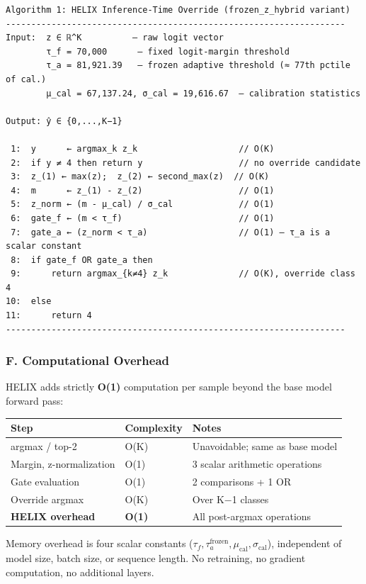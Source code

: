 \documentclass[
  conference]{IEEEtran}
\newcounter{none} %
\begin{document}
\begin{verbatim}
Algorithm 1: HELIX Inference-Time Override (frozen_z_hybrid variant)
-------------------------------------------------------------------
Input:  z ∈ ℝ^K          — raw logit vector
        τ_f = 70,000      — fixed logit-margin threshold
        τ_a = 81,921.39   — frozen adaptive threshold (≈ 77th pctile of cal.)
        μ_cal = 67,137.24, σ_cal = 19,616.67  — calibration statistics

Output: ŷ ∈ {0,...,K−1}

 1:  y      ← argmax_k z_k                    // O(K)
 2:  if y ≠ 4 then return y                   // no override candidate
 3:  z_(1) ← max(z);  z_(2) ← second_max(z)  // O(K)
 4:  m      ← z_(1) - z_(2)                   // O(1)
 5:  z_norm ← (m - μ_cal) / σ_cal             // O(1)
 6:  gate_f ← (m < τ_f)                       // O(1)
 7:  gate_a ← (z_norm < τ_a)                  // O(1) — τ_a is a scalar constant
 8:  if gate_f OR gate_a then
 9:      return argmax_{k≠4} z_k              // O(K), override class 4
10:  else
11:      return 4
-------------------------------------------------------------------
\end{verbatim}

\subsubsection{F. Computational
Overhead}\label{f.-computational-overhead}

HELIX adds strictly \textbf{O(1)} computation per sample beyond the base
model forward pass:

{\def\LTcaptype{none} %
\begin{longtable}[]{@{}lll@{}}
\toprule\noalign{}
Step & Complexity & Notes \\
\midrule\noalign{}
\endhead
\bottomrule\noalign{}
\endlastfoot
argmax / top-2 & O(K) & Unavoidable; same as base model \\
Margin, z-normalization & O(1) & 3 scalar arithmetic operations \\
Gate evaluation & O(1) & 2 comparisons + 1 OR \\
Override argmax & O(K) & Over K−1 classes \\
\textbf{HELIX overhead} & \textbf{O(1)} & All post-argmax operations \\
\end{longtable}
}

Memory overhead is four scalar constants
(\(\tau_f, \tau_a^{\text{frozen}}, \mu_{\text{cal}}, \sigma_{\text{cal}}\)),
independent of model size, batch size, or sequence length. No
retraining, no gradient computation, no additional layers.
\end{document}

